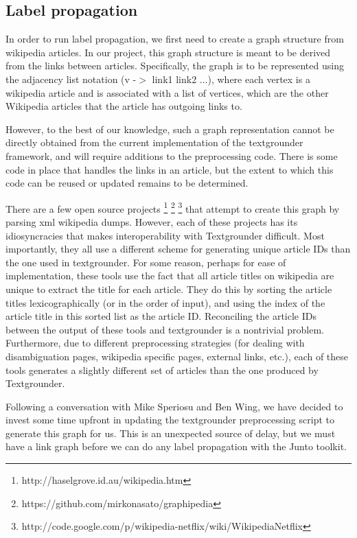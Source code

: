 \subsection{Label propagation}
In order to run label propagation, we first need to create a graph structure from
wikipedia articles. In our project, this graph structure is meant to be derived from the
links between articles. Specifically, the graph is to be represented using the
adjacency list notation (v -$>$ link1 link2 ...), where each vertex is a wikipedia
article and is associated with a list of vertices, which are the other Wikipedia articles that the article has outgoing links to.

However, to the best of our knowledge, such a graph representation cannot be
directly obtained from the current implementation of the textgrounder
framework, and will require additions to the preprocessing code. There is some code in place that handles the links in an article, but the extent to which this code can be reused or updated remains to be determined.

There are a few open source projects \footnote{http://haselgrove.id.au/wikipedia.htm} \footnote{https://github.com/mirkonasato/graphipedia} \footnote{http://code.google.com/p/wikipedia-netflix/wiki/WikipediaNetflix} that attempt to create this graph by parsing xml wikipedia dumps.
However, each of these projects has its idiosyncracies that makes interoperability with Textgrounder difficult. Most importantly, they all use a different scheme for generating unique article IDs than the one used in textgrounder.
For some reason, perhaps for ease of implementation, these tools use the fact that all article titles on wikipedia are unique to extract the title for each article.
They do this by sorting the article titles lexicographically (or in the order of input), and using the index of the article title in this sorted list as the article ID.
Reconciling the article IDs between the output of these tools and textgrounder is a nontrivial problem.
Furthermore, due to different preprocessing strategies (for dealing with disambiguation pages, wikipedia specific pages, external links, etc.), each of these tools generates a slightly different set of articles than the one produced by Textgrounder.

Following a conversation with Mike Speriosu and Ben Wing, we have decided to
invest some time upfront in updating the textgrounder preprocessing script to
generate this graph for us.
This is an unexpected source of delay, but we must have
a link graph before we can do any label propagation with the Junto toolkit.

